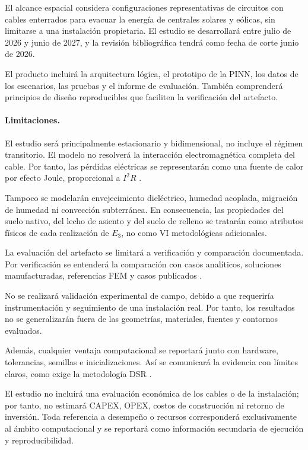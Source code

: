 \documentclass[11pt,a4paper,oneside]{report}
\begin{document}
El alcance espacial considera configuraciones representativas de circuitos con cables enterrados para evacuar la energía de centrales solares y eólicas, sin limitarse a una instalación propietaria. El estudio se desarrollará entre julio de 2026 y junio de 2027, y la revisión bibliográfica tendrá como fecha de corte junio de 2026.

El producto incluirá la arquitectura lógica, el prototipo de la PINN, los datos de los escenarios, las pruebas y el informe de evaluación. También comprenderá principios de diseño reproducibles que faciliten la verificación del artefacto.

\paragraph{Limitaciones.}

El estudio será principalmente estacionario y bidimensional, no incluye el régimen transitorio. El modelo no resolverá la interacción electromagnética completa del cable. Por tanto, las pérdidas eléctricas se representarán como una fuente de calor por efecto Joule, proporcional a $I^2R$ \parencites[752--760]{neher1957}[cláusulas 4--5]{iec60287}.

Tampoco se modelarán envejecimiento dieléctrico, humedad acoplada, migración de humedad ni convección subterránea. En consecuencia, las propiedades del suelo nativo, del lecho de asiento y del suelo de relleno se tratarán como atributos físicos de cada realización de $E_3$, no como VI metodológicas adicionales.

La evaluación del artefacto se limitará a verificación y comparación documentada. Por verificación se entenderá la comparación con casos analíticos, soluciones manufacturadas, referencias FEM y casos publicados \parencites{cigre2022}[3--4,93--99]{cigre2025}.

No se realizará validación experimental de campo, debido a que requeriría instrumentación y seguimiento de una instalación real. Por tanto, los resultados no se generalizarán fuera de las geometrías, materiales, fuentes y contornos evaluados.

Además, cualquier ventaja computacional se reportará junto con hardware, tolerancias, semillas e inicializaciones. Así se comunicará la evidencia con límites claros, como exige la metodología DSR \parencite[350--351]{gregor2013}.

El estudio no incluirá una evaluación económica de los cables o de la instalación; por tanto, no estimará CAPEX, OPEX, costos de construcción ni retorno de inversión. Toda referencia a desempeño o recursos corresponderá exclusivamente al ámbito computacional y se reportará como información secundaria de ejecución y reproducibilidad.
\end{document}
